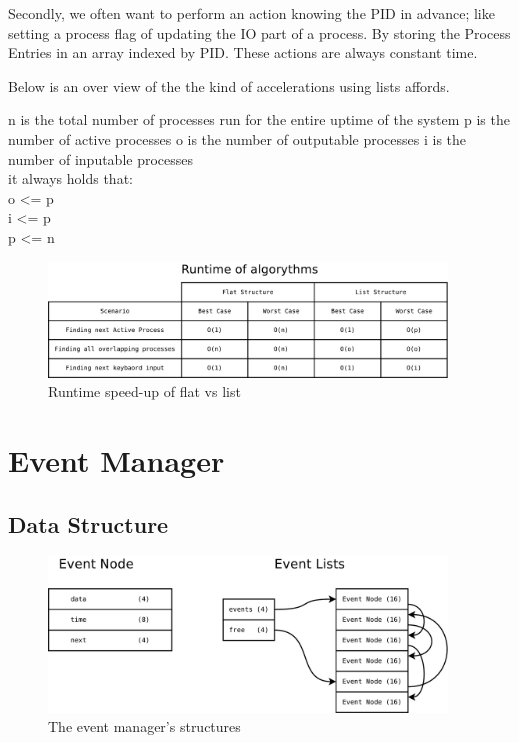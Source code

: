 \documentclass[a4paper]{report}
\begin{document}
Secondly, we often want to perform an action knowing the PID in advance; like setting a process flag of updating the IO part of a process. By storing the Process Entries in an array indexed by PID. These actions are always constant time.

Below is an over view of the the kind of accelerations using lists affords.

n is the total number of processes run for the entire uptime of the system
p is the number of active processes
o is the number of outputable processes
i is the number of inputable processes\\
it always holds that:\\
o \textless= p\\
i \textless= p\\
p \textless= n\\


\begin{figure}[ht]
\centering
\includegraphics[width=400px]{images/List_Speedup}
\caption{Runtime speed-up of flat vs list}
\label{fig:WinTitleBarScreen}
\end{figure}



\clearpage
\section{Event Manager}

\subsection{Data Structure}


\begin{figure}[ht]
\centering
\includegraphics[width=400px]{images/Events_Structure}
\caption{The event manager's structures}
\label{fig:WinTitleBarScreen}
\end{figure}
\end{document}
